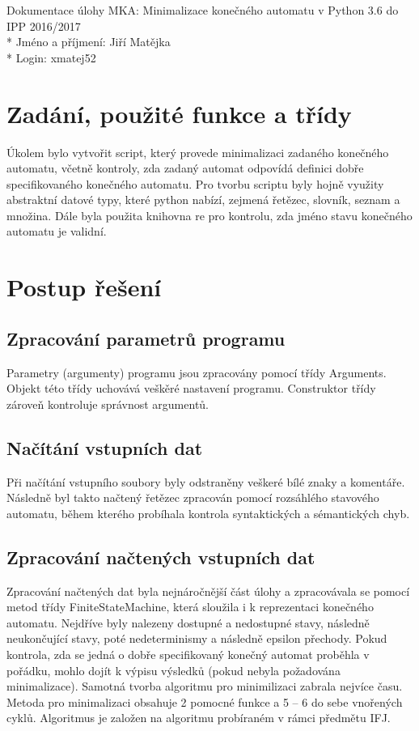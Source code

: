 \documentclass[a4paper, 10pt]{article}
\begin{document}
    \noindent
    Dokumentace úlohy MKA: Minimalizace konečného automatu v Python 3.6 do IPP 2016/2017 \\*
    Jméno a příjmení: Jiří Matějka \\*
    Login: xmatej52

    \section{Zadání, použité funkce a třídy}
        Úkolem bylo vytvořit script, který provede minimalizaci zadaného konečného automatu,
        včetně kontroly, zda zadaný automat odpovídá definici dobře specifikovaného
        konečného automatu.
        Pro tvorbu scriptu byly hojně využity abstraktní datové typy, které python
        nabízí, zejmená řetězec, slovník, seznam a množina. Dále byla použita knihovna
        re pro kontrolu, zda jméno stavu konečného automatu je validní.
    \section{Postup řešení}
        \subsection{Zpracování parametrů programu}
            Parametry (argumenty) programu jsou zpracovány pomocí třídy Arguments.
            Objekt této třídy uchovává veškěré nastavení programu. Construktor třídy
            zároveň kontroluje správnost argumentů.
        \subsection{Načítání vstupních dat}
            Při načítání vstupního soubory byly odstraněny veškeré bílé znaky a
            komentáře. Následně byl takto načtený řetězec zpracován pomocí rozsáhlého
            stavového automatu, během kterého probíhala kontrola syntaktických a
            sémantických chyb.
        \subsection{Zpracování načtených vstupních dat}
            Zpracování načtených dat byla nejnáročnější část úlohy a zpracovávala
            se pomocí metod třídy FiniteStateMachine, která sloužila i k reprezentaci
            konečného automatu. Nejdříve byly
            nalezeny dostupné a nedostupné stavy, následně neukončující stavy, poté
            nedeterminismy a následně epsilon přechody. Pokud kontrola, zda se jedná
            o dobře specifikovaný konečný automat proběhla v pořádku, mohlo dojít
            k výpisu výsledků (pokud nebyla požadována minimalizace). Samotná tvorba
            algoritmu pro minimilizaci zabrala nejvíce času. Metoda pro minimalizaci
            obsahuje 2 pomocné funkce a 5 -- 6 do sebe vnořených cyklů. Algoritmus
            je založen na algoritmu probíraném v rámci předmětu IFJ.
\end{document}
